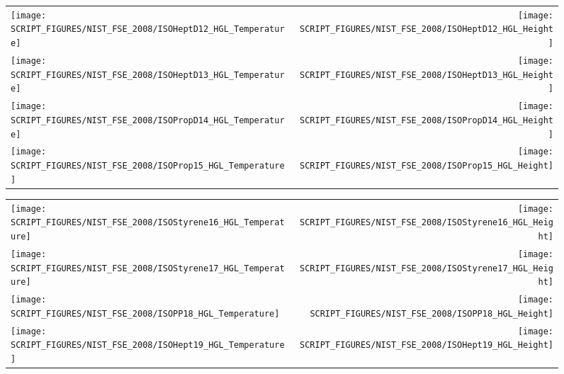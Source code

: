 \begin{figure}[p]
\begin{tabular*}{\textwidth}{l@{\extracolsep{\fill}}r}
\texttt{[image: SCRIPT\_FIGURES/NIST\_FSE\_2008/ISOHeptD12\_HGL\_Temperature]} &
\texttt{[image: SCRIPT\_FIGURES/NIST\_FSE\_2008/ISOHeptD12\_HGL\_Height]} \\
\texttt{[image: SCRIPT\_FIGURES/NIST\_FSE\_2008/ISOHeptD13\_HGL\_Temperature]} &
\texttt{[image: SCRIPT\_FIGURES/NIST\_FSE\_2008/ISOHeptD13\_HGL\_Height]} \\
\texttt{[image: SCRIPT\_FIGURES/NIST\_FSE\_2008/ISOPropD14\_HGL\_Temperature]} &
\texttt{[image: SCRIPT\_FIGURES/NIST\_FSE\_2008/ISOPropD14\_HGL\_Height]} \\
\texttt{[image: SCRIPT\_FIGURES/NIST\_FSE\_2008/ISOProp15\_HGL\_Temperature]} &
\texttt{[image: SCRIPT\_FIGURES/NIST\_FSE\_2008/ISOProp15\_HGL\_Height]}
\end{tabular*}
\label{NIST_FSE_2008_HGL_Temp_2}
\end{figure}

\begin{figure}[p]
\begin{tabular*}{\textwidth}{l@{\extracolsep{\fill}}r}
\texttt{[image: SCRIPT\_FIGURES/NIST\_FSE\_2008/ISOStyrene16\_HGL\_Temperature]} &
\texttt{[image: SCRIPT\_FIGURES/NIST\_FSE\_2008/ISOStyrene16\_HGL\_Height]} \\
\texttt{[image: SCRIPT\_FIGURES/NIST\_FSE\_2008/ISOStyrene17\_HGL\_Temperature]} &
\texttt{[image: SCRIPT\_FIGURES/NIST\_FSE\_2008/ISOStyrene17\_HGL\_Height]} \\
\texttt{[image: SCRIPT\_FIGURES/NIST\_FSE\_2008/ISOPP18\_HGL\_Temperature]} &
\texttt{[image: SCRIPT\_FIGURES/NIST\_FSE\_2008/ISOPP18\_HGL\_Height]} \\
\texttt{[image: SCRIPT\_FIGURES/NIST\_FSE\_2008/ISOHept19\_HGL\_Temperature]} &
\texttt{[image: SCRIPT\_FIGURES/NIST\_FSE\_2008/ISOHept19\_HGL\_Height]}
\end{tabular*}
\label{NIST_FSE_2008_HGL_Temp_3}
\end{figure}


